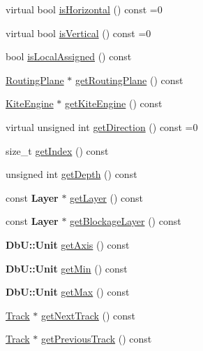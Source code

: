 \begin{DoxyCompactItemize}
\item 
virtual bool \mbox{\hyperlink{classKite_1_1Track_a9d3db1f8a5aca58f8f54d291faebf873}{is\+Horizontal}} () const =0
\item 
virtual bool \mbox{\hyperlink{classKite_1_1Track_a6fa2bf0568a2b295dd7cd1f7207247d5}{is\+Vertical}} () const =0
\item 
bool \mbox{\hyperlink{classKite_1_1Track_a6835a410623b90e8abec4c7a4e0905b3}{is\+Local\+Assigned}} () const
\item 
\mbox{\hyperlink{classKite_1_1RoutingPlane}{Routing\+Plane}} $\ast$ \mbox{\hyperlink{classKite_1_1Track_a056650e788f5235d0c4cc49e870f29b4}{get\+Routing\+Plane}} () const
\item 
\mbox{\hyperlink{classKite_1_1KiteEngine}{Kite\+Engine}} $\ast$ \mbox{\hyperlink{classKite_1_1Track_af7373bd3a4ee8fcf28a316230ed37fc0}{get\+Kite\+Engine}} () const
\item 
virtual unsigned int \mbox{\hyperlink{classKite_1_1Track_ae35b78590ed6aa546b626ef95f28c533}{get\+Direction}} () const =0
\item 
size\+\_\+t \mbox{\hyperlink{classKite_1_1Track_ac6f0fd2129f44fe6c0c6eaca9766e1a3}{get\+Index}} () const
\item 
unsigned int \mbox{\hyperlink{classKite_1_1Track_a6c4d9081746b8daa3e45e5e3dd185b60}{get\+Depth}} () const
\item 
const \textbf{ Layer} $\ast$ \mbox{\hyperlink{classKite_1_1Track_ab468d5fc5ad722f437b81decc8209ab7}{get\+Layer}} () const
\item 
const \textbf{ Layer} $\ast$ \mbox{\hyperlink{classKite_1_1Track_aa719edbfb0c3d2f294cf658f1c6bfb37}{get\+Blockage\+Layer}} () const
\item 
\textbf{ Db\+U\+::\+Unit} \mbox{\hyperlink{classKite_1_1Track_ab5b5aaa5b318369feee6003dbad039c2}{get\+Axis}} () const
\item 
\textbf{ Db\+U\+::\+Unit} \mbox{\hyperlink{classKite_1_1Track_a71f401dbc8d152b50522ee459ef63441}{get\+Min}} () const
\item 
\textbf{ Db\+U\+::\+Unit} \mbox{\hyperlink{classKite_1_1Track_a7fdc462696aede86c051edfaa6268e9a}{get\+Max}} () const
\item 
\mbox{\hyperlink{classKite_1_1Track}{Track}} $\ast$ \mbox{\hyperlink{classKite_1_1Track_a1b8af68504f2de84cb85cf25e30f93bd}{get\+Next\+Track}} () const
\item 
\mbox{\hyperlink{classKite_1_1Track}{Track}} $\ast$ \mbox{\hyperlink{classKite_1_1Track_a984171d836a7f61df95e74beeddcf6b5}{get\+Previous\+Track}} () const

\end{DoxyCompactItemize}
